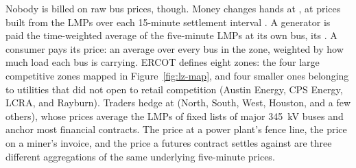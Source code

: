 Nobody is billed on raw bus prices, though. Money changes hands at , at prices built from the LMPs over each 15-minute settlement interval \autocite{ercot2026protocols}. %
A generator is paid the time-weighted average of the five-minute LMPs at its own bus, its . A consumer pays its  price: an average over every bus in the zone, weighted by how much load each bus is carrying. ERCOT defines eight zones: the four large competitive zones mapped in Figure~\ref{fig:lz-map}, and four smaller ones belonging to utilities that did not open to retail competition (Austin Energy, CPS Energy, LCRA, and Rayburn). Traders hedge at  (North, South, West, Houston, and a few others), whose prices average the LMPs of fixed lists of major 345~kV buses and anchor most financial contracts. %
The price at a power plant's fence line, the price on a miner's invoice, and the price a futures contract settles against are three different aggregations of the same underlying five-minute prices.

